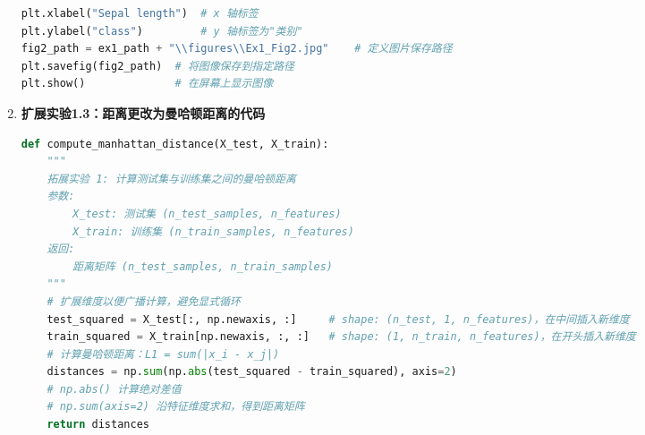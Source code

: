 \documentclass{../common/SCNU_Experimental_Report}
\begin{document}
\begin{enumerate}
\begin{lstlisting}[language=Python]
plt.xlabel("Sepal length")  # x 轴标签
plt.ylabel("class")         # y 轴标签为"类别"
fig2_path = ex1_path + "\\figures\\Ex1_Fig2.jpg"    # 定义图片保存路径
plt.savefig(fig2_path)  # 将图像保存到指定路径
plt.show()              # 在屏幕上显示图像
\end{lstlisting}

    \item \textbf{扩展实验1.3：距离更改为曼哈顿距离的代码}

          \begin{lstlisting}[language=Python]
def compute_manhattan_distance(X_test, X_train):
    """
    拓展实验 1: 计算测试集与训练集之间的曼哈顿距离
    参数:
        X_test: 测试集 (n_test_samples, n_features)
        X_train: 训练集 (n_train_samples, n_features)
    返回:
        距离矩阵 (n_test_samples, n_train_samples)
    """
    # 扩展维度以便广播计算，避免显式循环
    test_squared = X_test[:, np.newaxis, :]     # shape: (n_test, 1, n_features)，在中间插入新维度
    train_squared = X_train[np.newaxis, :, :]   # shape: (1, n_train, n_features)，在开头插入新维度
    # 计算曼哈顿距离：L1 = sum(|x_i - x_j|)
    distances = np.sum(np.abs(test_squared - train_squared), axis=2)
    # np.abs() 计算绝对差值
    # np.sum(axis=2) 沿特征维度求和，得到距离矩阵
    return distances
\end{lstlisting}
\end{enumerate}
\end{document}
